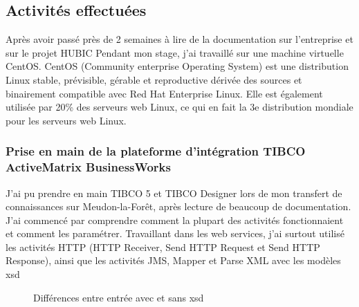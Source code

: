 \subsection{Activités effectuées}
Après avoir passé près de 2 semaines à lire de la documentation sur l'entreprise et sur
le projet HUBIC Pendant mon stage, j'ai travaillé sur une machine virtuelle CentOS. CentOS
(Community enterprise Operating System) est une distribution Linux stable, prévisible, gérable
et reproductive dérivée des sources et binairement compatible avec Red Hat Enterprise Linux.
Elle est également utilisée par 20\% des serveurs web Linux, ce qui en fait la 3e distribution
mondiale pour les serveurs web Linux.
\subsubsection{Prise en main de la plateforme d'intégration TIBCO ActiveMatrix BusinessWorks}
J'ai pu prendre en main TIBCO 5 et TIBCO Designer lors de mon transfert de connaissances
sur Meudon-la-Forêt, après lecture de beaucoup de documentation. J'ai commencé par
comprendre comment la plupart des activités fonctionnaient et comment les paramétrer. Travaillant
dans les web services, j'ai surtout utilisé les activités HTTP (HTTP Receiver, Send
HTTP Request et Send HTTP Response), ainsi que les activités JMS, Mapper et Parse XML
avec les modèles \gls{xsd}
\begin{figure}[!h]
	\centering \caption{Différences entre entrée avec et sans \gls{xsd}}
	\centering
	\label{Diff}
\end{figure}


